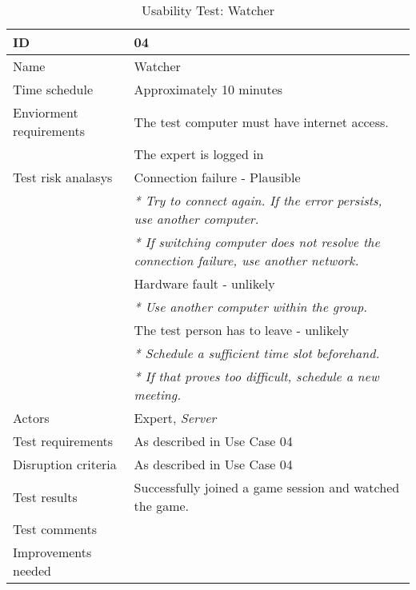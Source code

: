 {\footnotesize
\begin{table}[H]
\begin{tabular}{| p{5cm} | p{10cm} |}\hline
	\textbf{ID}	& \textbf{04} \\ \hline
	Name		& Watcher \\ \hline
	Time schedule	& Approximately 10 minutes\\ \hline
	Enviorment requirements 
		& The test computer must have internet access. \\ 
		& The expert is logged in\\ \hline
	Test risk analasys 
		& Connection failure - Plausible \\
		& \emph{* Try to connect again. If the error persists, use another computer.} \\
		& \emph{* If switching computer does not resolve the connection failure, use another network.}\\
		& Hardware fault - unlikely \\
		& \emph{* Use another computer within the group.} \\
		& The test person has to leave - unlikely \\
		& \emph{* Schedule a sufficient time slot beforehand.} \\
		& \emph{* If that proves too difficult, schedule a new meeting.}\\ \hline
	Actors	& Expert, \emph{Server}\\ \hline
	Test requirements & As described in Use Case 04 \\ \hline
	Disruption criteria & As described in Use Case 04  \\ \hline
	Test results & Successfully joined a game session and watched the game.
		& \\ \hline
	Test comments
		& \\ \hline
	Improvements needed
		& \\ \hline
\end{tabular}


\caption{Usability Test: Watcher}
\label{fig:usability_test_4}
\end{table}}



